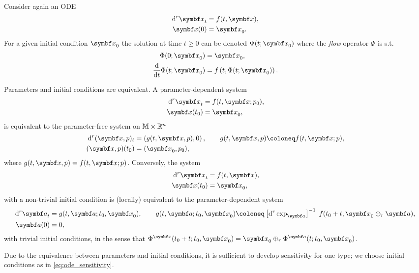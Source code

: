 Consider again an ODE
\begin{equation}
  \label{eq:ode_sensitivity}
  \begin{aligned}
  \mathrm{d}^r \x_t & = f(t, \x), \\
  \x(0) & = \x_{0}.
\end{aligned}
\end{equation}
For a given initial condition $\x_{0}$ the solution at time $t \geq 0$ can be denoted $\Phi(t; \x_{0})$ where the \emph{flow} operator $\Phi$ is s.t.
\begin{equation}
  \begin{aligned}
    \Phi(0; \x_{0}) &= \x_{0}, \\
    \frac{\mathrm{d}}{\mathrm{d}t} \Phi(t; \x_{0}) &= f\left(t, \Phi(t; \x_{0}) \right).
  \end{aligned}
\end{equation}

\begin{remark}
  Parameters and initial conditions are equivalent. A parameter-dependent system
  \begin{equation}
    \begin{aligned}
      \mathrm{d}^r \x_t & = f(t, \x; p_{0}), \\
      \x(t_{0}) & = \x_{0},
    \end{aligned}
  \end{equation}
  is equivalent to the parameter-free system on $\mathbb{M} \times \mathbb{R}^{n}$
  \begin{equation}
    \begin{aligned}
      \mathrm{d}^r (\x, p)_t & =  \left(g(t, \x, p), 0\right), \qquad g(t, \x, p) \coloneq f(t, \x; p), \\
      (\x, p)(t_{0}) & = (\x_0, p_{0}),
    \end{aligned}
  \end{equation}
  where $g(t, \x, p) = f(t, \x; p)$. Conversely, the system
  \begin{equation}
    \begin{aligned}
      \mathrm{d}^{r} \x_{t} & = f(t, \x), \\
      \x(t_{0}) & = \x_{0},
    \end{aligned}
  \end{equation}
  with a non-trivial initial condition is (locally) equivalent to the parameter-dependent system
  \begin{equation}
    \begin{aligned}
      \mathrm{d}^{r} \a_{t} & = g(t, \a; t_{0}, \x_{0}), \qquad g(t, \a; t_{0}, \x_{0}) \coloneq \left[ \mathrm{d}^{r} \exp_{\a} \right]^{-1} \; f(t_{0} + t, \x_{0} \oplus_{r} \a), \\
      \a(0) & = 0,
    \end{aligned}
  \end{equation}
  with trivial initial conditions, in the sense that $\Phi^{\x}(t_{0} + t; t_{0}, \x_{0}) = \x_{0} \oplus_{r} \Phi^{\a}(t; t_{0}, \x_{0})$.
\end{remark}
Due to the equivalence between parameters and initial conditions, it is sufficient to develop sensitivity for one type; we choose initial conditions as in \eqref{eq:ode_sensitivity}.

